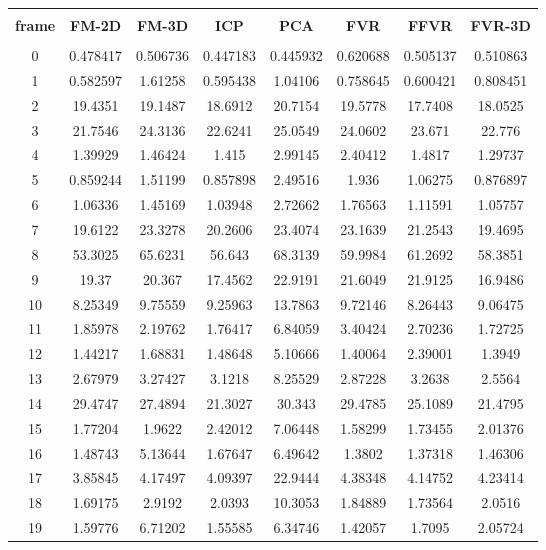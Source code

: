 \begin{center}
\begin{longtable}{cccccccc}
\hline \\
\textbf{frame} & \textbf{FM-2D} & \textbf{FM-3D} & \textbf{ICP} & \textbf{PCA} & \textbf{FVR} & \textbf{FFVR} & \textbf{FVR-3D} \\
\hline \\
0 & 0.478417 & 0.506736 & 0.447183 & 0.445932 & 0.620688 & 0.505137 & 0.510863\\
1 & 0.582597 & 1.61258 & 0.595438 & 1.04106 & 0.758645 & 0.600421 & 0.808451\\
2 & 19.4351 & 19.1487 & 18.6912 & 20.7154 & 19.5778 & 17.7408 & 18.0525\\
3 & 21.7546 & 24.3136 & 22.6241 & 25.0549 & 24.0602 & 23.671 & 22.776\\
4 & 1.39929 & 1.46424 & 1.415 & 2.99145 & 2.40412 & 1.4817 & 1.29737\\
5 & 0.859244 & 1.51199 & 0.857898 & 2.49516 & 1.936 & 1.06275 & 0.876897\\
6 & 1.06336 & 1.45169 & 1.03948 & 2.72662 & 1.76563 & 1.11591 & 1.05757\\
7 & 19.6122 & 23.3278 & 20.2606 & 23.4074 & 23.1639 & 21.2543 & 19.4695\\
8 & 53.3025 & 65.6231 & 56.643 & 68.3139 & 59.9984 & 61.2692 & 58.3851\\
9 & 19.37 & 20.367 & 17.4562 & 22.9191 & 21.6049 & 21.9125 & 16.9486\\
10 & 8.25349 & 9.75559 & 9.25963 & 13.7863 & 9.72146 & 8.26443 & 9.06475\\
11 & 1.85978 & 2.19762 & 1.76417 & 6.84059 & 3.40424 & 2.70236 & 1.72725\\
12 & 1.44217 & 1.68831 & 1.48648 & 5.10666 & 1.40064 & 2.39001 & 1.3949\\
13 & 2.67979 & 3.27427 & 3.1218 & 8.25529 & 2.87228 & 3.2638 & 2.5564\\
14 & 29.4747 & 27.4894 & 21.3027 & 30.343 & 29.4785 & 25.1089 & 21.4795\\
15 & 1.77204 & 1.9622 & 2.42012 & 7.06448 & 1.58299 & 1.73455 & 2.01376\\
16 & 1.48743 & 5.13644 & 1.67647 & 6.49642 & 1.3802 & 1.37318 & 1.46306\\
17 & 3.85845 & 4.17497 & 4.09397 & 22.9444 & 4.38348 & 4.14752 & 4.23414\\
18 & 1.69175 & 2.9192 & 2.0393 & 10.3053 & 1.84889 & 1.73564 & 2.0516\\
19 & 1.59776 & 6.71202 & 1.55585 & 6.34746 & 1.42057 & 1.7095 & 2.05724\\

\end{longtable}
\end{center}
